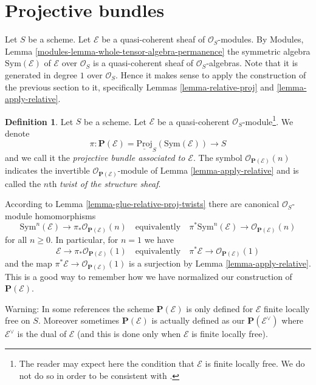 \documentclass{stacks-project}
\theoremstyle{plain}
\theoremstyle{definition}
\newtheorem{definition}[subsection]{Definition}
\theoremstyle{remark}
\numberwithin{equation}{subsection}
\begin{document}
\section{Projective bundles}
\label{section-projective-bundle}

\noindent
Let $S$ be a scheme.
Let $\mathcal{E}$ be a quasi-coherent sheaf of $\mathcal{O}_S$-modules.
By Modules, Lemma \ref{modules-lemma-whole-tensor-algebra-permanence}
the symmetric algebra $\text{Sym}(\mathcal{E})$ of
$\mathcal{E}$ over $\mathcal{O}_S$
is a quasi-coherent sheaf of $\mathcal{O}_S$-algebras.
Note that it is generated in degree $1$ over $\mathcal{O}_S$.
Hence it makes sense to apply the construction of the
previous section to it, specifically Lemmas
\ref{lemma-relative-proj} and \ref{lemma-apply-relative}.

\begin{definition}
\label{definition-projective-bundle}
Let $S$ be a scheme. Let $\mathcal{E}$ be a quasi-coherent
$\mathcal{O}_S$-module\footnote{The reader may expect here
the condition that $\mathcal{E}$ is finite locally free. We do not
do so in order to be consistent with
\cite[II, Definition 4.1.1]{EGA}.}.
We denote
$$
\pi :
\mathbf{P}(\mathcal{E}) = \underline{\text{Proj}}_S(\text{Sym}(\mathcal{E}))
\longrightarrow
S
$$
and we call it the {\it projective bundle associated to $\mathcal{E}$}.
The symbol $\mathcal{O}_{\mathbf{P}(\mathcal{E})}(n)$
indicates the invertible $\mathcal{O}_{\mathbf{P}(\mathcal{E})}$-module
of Lemma \ref{lemma-apply-relative} and is called the $n$th
{\it twist of the structure sheaf}.
\end{definition}

\noindent
According to Lemma \ref{lemma-glue-relative-proj-twists} there are
canonical $\mathcal{O}_S$-module homomorphisms
$$
\text{Sym}^n(\mathcal{E})
\longrightarrow
\pi_*\mathcal{O}_{\mathbf{P}(\mathcal{E})}(n)
\quad\text{equivalently}\quad
\pi^*\text{Sym}^n(\mathcal{E})
\longrightarrow
\mathcal{O}_{\mathbf{P}(\mathcal{E})}(n)
$$
for all $n \geq 0$. In particular, for $n = 1$ we have
$$
\mathcal{E}
\longrightarrow
\pi_*\mathcal{O}_{\mathbf{P}(\mathcal{E})}(1)
\quad\text{equivalently}\quad
\pi^*\mathcal{E}
\longrightarrow
\mathcal{O}_{\mathbf{P}(\mathcal{E})}(1)
$$
and the map $\pi^*\mathcal{E} \to \mathcal{O}_{\mathbf{P}(\mathcal{E})}(1)$
is a surjection by Lemma \ref{lemma-apply-relative}.
This is a good way to remember how we have normalized
our construction of $\mathbf{P}(\mathcal{E})$.

\medskip\noindent
Warning: In some references the scheme $\mathbf{P}(\mathcal{E})$
is only defined for $\mathcal{E}$ finite locally free on $S$.
Moreover sometimes $\mathbf{P}(\mathcal{E})$ is actually defined as our
$\mathbf{P}(\mathcal{E}^\vee)$ where $\mathcal{E}^\vee$
is the dual of $\mathcal{E}$ (and this is done only when $\mathcal{E}$ is
finite locally free).
\end{document}
